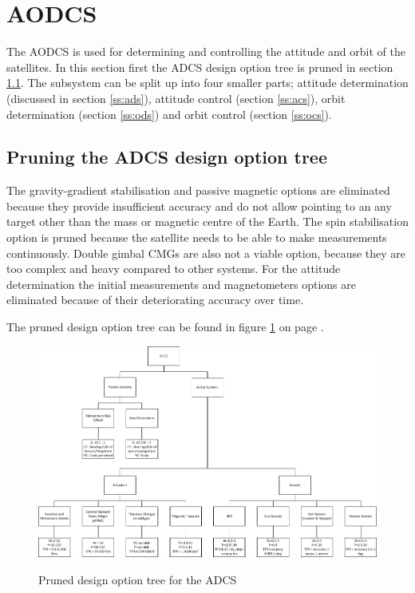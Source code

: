 \section{\acl{AODCS}}
\label{aodcs}
The \ac{AODCS} is used for determining and controlling the attitude and orbit of the satellites. In this section first the \ac{ADCS} design option tree is pruned in section \ref{pruneADCS}. The subsystem can be split up into four smaller parts; attitude determination (discussed in section \ref{ss:ads}), attitude control (section \ref{ss:acs}), orbit determination (section \ref{ss:ods}) and orbit control (section \ref{ss:ocs}). 

\subsection{Pruning the \acl{ADCS} design option tree}
\label{pruneADCS}
The gravity-gradient stabilisation and passive magnetic options are eliminated because they provide insufficient accuracy and do not allow pointing to an any target other than the mass or magnetic centre of the Earth. The spin stabilisation option is pruned because the satellite needs to be able to make measurements continuously. Double gimbal \acp{CMG} are also not a viable option, because they are too complex and heavy compared to other systems.
For the attitude determination the initial measurements and magnetometers options are eliminated because of their deteriorating accuracy over time.

The pruned design option tree can be found in figure \ref{fig:pruneADCS} on page \pageref{fig:pruneADCS}.

\begin{figure}
\centering
\includegraphics[width=1.0\textwidth, angle=90]{chapters/img/prunedADCStree.png}
\label{fig:pruneADCS}
\caption{Pruned design option tree for the \acs{ADCS}}
\end{figure}

